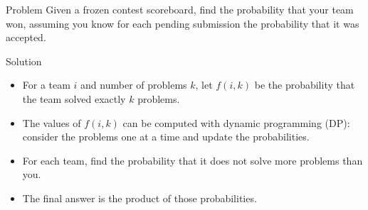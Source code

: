 \begin{slide}
  \begin{block}{Problem}
    Given a frozen contest scoreboard, find the probability that your
    team won, assuming you know for each pending submission the
    probability that it was accepted.
  \end{block}
  \pause
  \begin{block}{Solution}
    \begin{itemize}
      \item For a team $i$ and number of problems $k$, let $f(i,k)$ be
        the probability that the team solved exactly $k$ problems.
      \item The values of $f(i,k)$ can be computed with dynamic
        programming (DP): consider the problems one at a time and
        update the probabilities.
      \item For each team, find the probability that it does not solve
        more problems than you.
      \item The final answer is the product of those probabilities.
    \end{itemize}
  \end{block}
\end{slide} 
